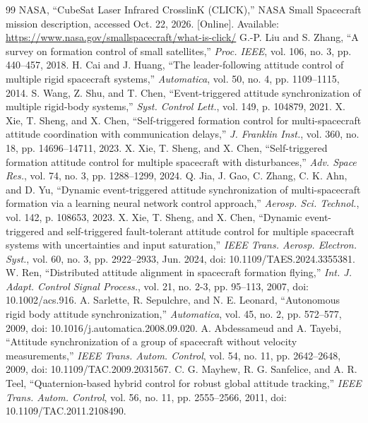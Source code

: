 \begin{thebibliography}{99}
 NASA, ``CubeSat Laser Infrared CrosslinK (CLICK),'' NASA Small Spacecraft mission description, accessed Oct. 22, 2026. [Online]. Available: \url{https://www.nasa.gov/smallspacecraft/what-is-click/}
 G.-P. Liu and S. Zhang, ``A survey on formation control of small satellites,'' \emph{Proc. IEEE}, vol. 106, no. 3, pp. 440--457, 2018.
 H. Cai and J. Huang, ``The leader-following attitude control of multiple rigid spacecraft systems,'' \emph{Automatica}, vol. 50, no. 4, pp. 1109--1115, 2014.
 S. Wang, Z. Shu, and T. Chen, ``Event-triggered attitude synchronization of multiple rigid-body systems,'' \emph{Syst. Control Lett.}, vol. 149, p. 104879, 2021.
 X. Xie, T. Sheng, and X. Chen, ``Self-triggered formation control for multi-spacecraft attitude coordination with communication delays,'' \emph{J. Franklin Inst.}, vol. 360, no. 18, pp. 14696--14711, 2023.
 X. Xie, T. Sheng, and X. Chen, ``Self-triggered formation attitude control for multiple spacecraft with disturbances,'' \emph{Adv. Space Res.}, vol. 74, no. 3, pp. 1288--1299, 2024.
 Q. Jia, J. Gao, C. Zhang, C. K. Ahn, and D. Yu, ``Dynamic event-triggered attitude synchronization of multi-spacecraft formation via a learning neural network control approach,'' \emph{Aerosp. Sci. Technol.}, vol. 142, p. 108653, 2023.
 X. Xie, T. Sheng, and X. Chen, ``Dynamic event-triggered and self-triggered fault-tolerant attitude control for multiple spacecraft systems with uncertainties and input saturation,'' \emph{IEEE Trans. Aerosp. Electron. Syst.}, vol. 60, no. 3, pp. 2922--2933, Jun. 2024, doi: 10.1109/TAES.2024.3355381.
 W. Ren, ``Distributed attitude alignment in spacecraft formation flying,'' \emph{Int. J. Adapt. Control Signal Process.}, vol. 21, no. 2-3, pp. 95--113, 2007, doi: 10.1002/acs.916.
 A. Sarlette, R. Sepulchre, and N. E. Leonard, ``Autonomous rigid body attitude synchronization,'' \emph{Automatica}, vol. 45, no. 2, pp. 572--577, 2009, doi: 10.1016/j.automatica.2008.09.020.
 A. Abdessameud and A. Tayebi, ``Attitude synchronization of a group of spacecraft without velocity measurements,'' \emph{IEEE Trans. Autom. Control}, vol. 54, no. 11, pp. 2642--2648, 2009, doi: 10.1109/TAC.2009.2031567.
 C. G. Mayhew, R. G. Sanfelice, and A. R. Teel, ``Quaternion-based hybrid control for robust global attitude tracking,'' \emph{IEEE Trans. Autom. Control}, vol. 56, no. 11, pp. 2555--2566, 2011, doi: 10.1109/TAC.2011.2108490.

\end{thebibliography}
